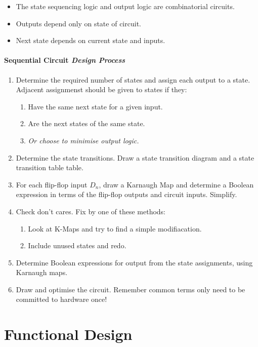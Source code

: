 \documentclass[twocolumn,english]{article}
\begin{document}
\begin{itemize}
\item The state sequencing logic and output logic are combinatorial circuits.
\item Outputs depend only on state of circuit.
\item Next state depends on current state and inputs.
\end{itemize}

\paragraph{Sequential Circuit \emph{Design Process}}
\begin{enumerate}
\item Determine the required number of states and assign each output to
a state. Adjacent assignmenst should be given to states if they:

\begin{enumerate}
\item Have the same next state for a given input.
\item Are the next states of the same state.
\item \emph{Or choose to minimise output logic.}
\end{enumerate}
\item Determine the state transitions. Draw a state transition diagram and
a state transition table table.
\item For each flip-flop input $D_{n}$, draw a Karnaugh Map and determine
a Boolean expression in terms of the flip-flop outputs and circuit
inputs. Simplify.
\item Check don't cares. Fix by one of these methods:

\begin{enumerate}
\item Look at K-Maps and try to find a simple modifiacation.
\item Include unused states and redo.
\end{enumerate}
\item Determine Boolean expressions for output from the state assignments,
using Karnaugh maps.
\item Draw and optimise the circuit. Remember common terms only need to
be committed to hardware once!
\end{enumerate}

\section{Functional Design}
\end{document}

